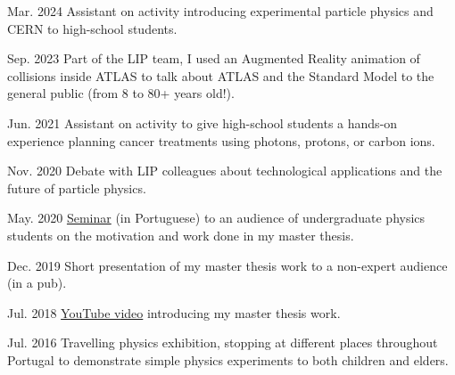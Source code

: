 \begin{cventries}
    
    {}{Mar. 2024}
    {Assistant on activity introducing experimental particle physics and CERN to high-school students.}

    {}{Sep. 2023}
    {Part of the LIP team, I used an Augmented Reality animation of collisions inside ATLAS to talk about ATLAS and the Standard Model to the general public (from 8 to 80+ years old!).} 

    {}{Jun. 2021}
    {Assistant on activity to give high-school students a hands-on experience planning cancer treatments using photons, protons, or carbon ions.}

    {}{Nov. 2020}
    {Debate with LIP colleagues about technological applications and the future of particle physics.} 

    {}{May. 2020}
    {\href{https://www.youtube.com/watch?v=LSVwibOst74}{Seminar} (in Portuguese) to an audience of undergraduate physics students on the motivation and work done in my master thesis.}

    {}{Dec. 2019}
    {Short presentation of my master thesis work to a non-expert audience (in a pub).}

    {}{Jul. 2018}
    {\href{https://youtu.be/gYDkRYdr_D4}{YouTube video} introducing my master thesis work.}

    {}{Jul. 2016}
    {Travelling physics exhibition, stopping at different places throughout Portugal to demonstrate simple physics experiments to both children and elders.}

\end{cventries}